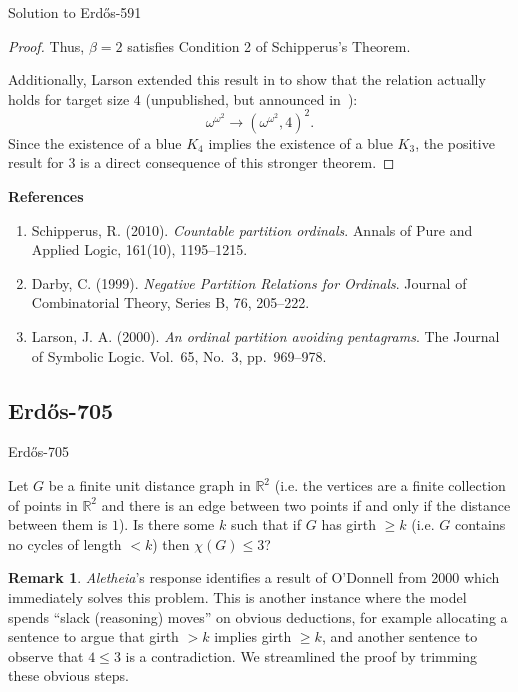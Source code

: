 \documentclass{article}
\theoremstyle{plain}
\theoremstyle{definition}
\newtheorem{remark}{Remark}[section]
\newcommand{\Aletheia}{\emph{Aletheia}}
\begin{document}
\begin{solution}{Solution to {Erdős-591}}
\begin{proof}
Thus, $\beta = 2$ satisfies Condition 2 of Schipperus's Theorem.

Additionally, Larson extended this result in \cite{Larson00} to show that the relation actually holds for target size 4 (unpublished, but announced in~\cite{darby99}):
$$ \omega^{\omega^2} \to (\omega^{\omega^2}, 4)^2. $$
Since the existence of a blue $K_4$ implies the existence of a blue $K_3$, the positive result for 3 is a direct consequence of this stronger theorem.
\end{proof}

\medskip
\textbf{References}
\begin{enumerate}
    \item\cite{Sch10} Schipperus, R. (2010). \textit{Countable partition ordinals}. {Annals of Pure and Applied Logic}, 161(10), 1195–1215.
    
    
    \item\cite{darby99} Darby, C. (1999). \textit{Negative Partition Relations for Ordinals}. Journal of Combinatorial Theory, Series B, 76, 205--222.

    \item\cite{Larson00} Larson, J. A. (2000). \textit{An ordinal partition avoiding pentagrams}. The Journal of Symbolic Logic. Vol.~65, No.~3, pp.~969--978.
\end{enumerate}
\end{solution}


\subsection{Erdős-705}

\begin{problem}{Erdős-705 \cite{Er81}}

Let $G$ be a finite unit distance graph in $\mathbb{R}^2$ (i.e. the vertices are a finite collection of points in $\mathbb{R}^2$ and there is an edge between two points if and only if the distance between them is $1$). Is there some $k$ such that if $G$ has girth $\geq k$ (i.e. $G$ contains no cycles of length $<k$) then $\chi(G)\leq 3$?
\end{problem}

\begin{remark}
    \Aletheia's response identifies a result of O'Donnell \cite{OD99Thesis} from 2000 which immediately solves this problem. This is another instance where the model spends ``slack (reasoning) moves'' on obvious deductions, for example allocating a sentence to argue that girth $> k$ implies girth $\geq k$, and another sentence to observe that $4 \leq 3$ is a contradiction. We streamlined the proof by trimming these obvious steps. 
\end{remark}
\end{document}
